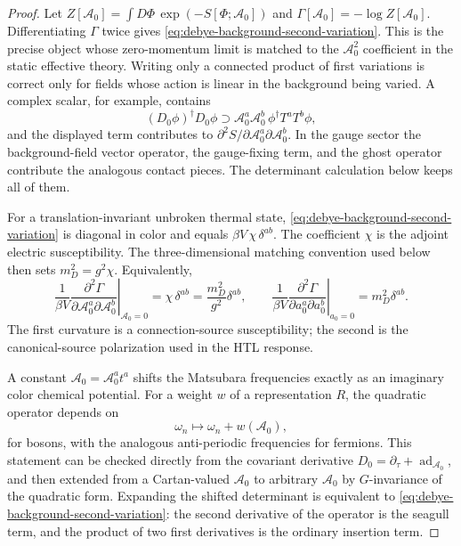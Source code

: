 \begin{proof}
Let \(Z[\mathcal A_0]=\int D\Phi\,\exp(-S[\Phi;\mathcal A_0])\) and
\(\Gamma[\mathcal A_0]=-\log Z[\mathcal A_0]\).  Differentiating
\(\Gamma\) twice gives
\eqref{eq:debye-background-second-variation}.  This is the precise object
whose zero-momentum limit is matched to the \(\mathcal A_0^2\) coefficient in
the static effective theory.  Writing only a connected product of first
variations is correct only for fields whose action is linear in the
background being varied.  A complex scalar, for example, contains
\[
  (D_0\phi)^\dagger D_0\phi
  \supset
  \mathcal A_0^a\mathcal A_0^b\,\phi^\dagger T^aT^b\phi ,
\]
and the displayed term contributes to
\(\partial^2S/\partial \mathcal A_0^a\partial \mathcal A_0^b\).  In the
gauge sector the background-field vector operator, the gauge-fixing term, and
the ghost operator contribute the analogous contact pieces.  The determinant
calculation below keeps all of them.

For a translation-invariant unbroken thermal state,
\eqref{eq:debye-background-second-variation} is diagonal in color and equals
\(\beta V\,\chi\,\delta^{ab}\).  The coefficient \(\chi\) is the adjoint
electric susceptibility.  The three-dimensional matching convention used
below then sets \(m_D^2=g^2\chi\).  Equivalently,
\begin{equation}
  \frac{1}{\beta V}
  \left.
  \frac{\partial^2\Gamma}{\partial \mathcal A_0^a\partial \mathcal A_0^b}
  \right|_{\mathcal A_0=0}
  =
  \chi\,\delta^{ab}
  =
  \frac{m_D^2}{g^2}\delta^{ab},
  \qquad
  \frac{1}{\beta V}
  \left.
  \frac{\partial^2\Gamma}{\partial a_0^a\partial a_0^b}
  \right|_{a_0=0}
  =
  m_D^2\delta^{ab}.
  \label{eq:debye-connection-canonical-second-variation}
\end{equation}
The first curvature is a connection-source susceptibility; the second is the
canonical-source polarization used in the HTL response.

A constant \(\mathcal A_0=\mathcal A_0^at^a\) shifts
the Matsubara frequencies exactly as an imaginary color chemical potential.
For a weight \(w\) of a representation \(R\), the quadratic operator depends
on
\[
  \omega_n\longmapsto \omega_n+w(\mathcal A_0),
\]
for bosons, with the analogous anti-periodic frequencies for fermions.  This
statement can be checked directly from the covariant derivative
\(D_0=\partial_\tau+\operatorname{ad}_{\mathcal A_0}\), and then extended from
a Cartan-valued \(\mathcal A_0\) to arbitrary \(\mathcal A_0\) by
\(G\)-invariance of the quadratic form.  Expanding the shifted determinant is
equivalent to
\eqref{eq:debye-background-second-variation}: the second derivative of the
operator is the seagull term, and the product of two first derivatives is the
ordinary insertion term.


\end{proof}
